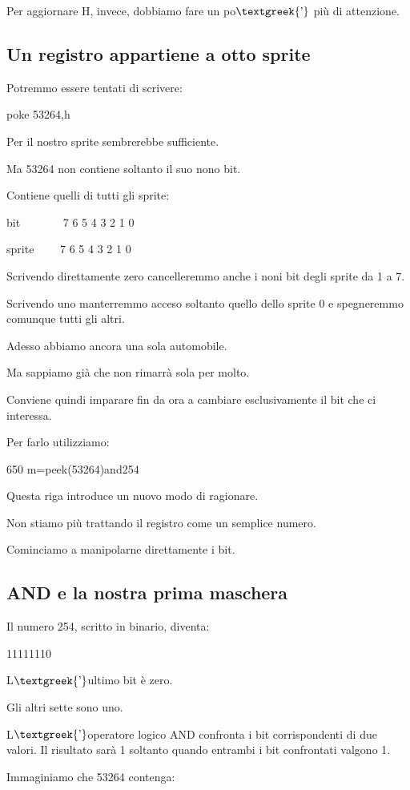 \documentclass{article}
\begin{document}
Per aggiornare H, invece, dobbiamo fare un po$\text{\textgreek{’}}$ più di attenzione.

\subsection{Un registro appartiene a otto sprite}
Potremmo essere tentati di scrivere:

poke 53264,h

Per il nostro sprite sembrerebbe sufficiente.

Ma 53264 non contiene soltanto il suo nono bit.

Contiene quelli di tutti gli sprite:

bit \ \ \ \ \ \ \ 7 6 5 4 3 2 1 0

sprite \ \ \ \ 7 6 5 4 3 2 1 0

Scrivendo direttamente zero cancelleremmo anche i noni bit degli sprite da 1 a 7.

Scrivendo uno manterremmo acceso soltanto quello dello sprite 0 e spegneremmo comunque tutti gli altri.

Adesso abbiamo ancora una sola automobile.

Ma sappiamo già che non rimarrà sola per molto.

Conviene quindi imparare fin da ora a cambiare esclusivamente il bit che ci interessa.

Per farlo utilizziamo:

650 m=peek(53264)and254

Questa riga introduce un nuovo modo di ragionare.

Non stiamo più trattando il registro come un semplice numero.

Cominciamo a manipolarne direttamente i bit.

\subsection{AND e la nostra prima maschera}
Il numero 254, scritto in binario, diventa:

11111110

L$\text{\textgreek{’}}$ultimo bit è zero.

Gli altri sette sono uno.

L$\text{\textgreek{’}}$operatore logico AND confronta i bit corrispondenti di due valori. Il risultato sarà 1 soltanto
quando entrambi i bit confrontati valgono 1.

Immaginiamo che 53264 contenga:
\end{document}
